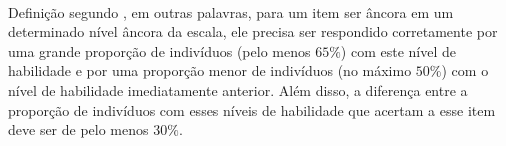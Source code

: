 	\paragraph{}
	    Definição segundo \textcite{Dalton}, em outras palavras, para um item ser âncora em um determinado nível âncora da escala, ele precisa ser respondido corretamente por uma grande 	proporção de indivíduos (pelo menos $65\%$) com este nível de habilidade e por uma proporção menor de indivíduos (no máximo $50\%$) com o nível de habilidade imediatamente anterior. Além disso, a diferença entre a proporção de indivíduos com esses níveis de habilidade que acertam a esse item deve ser de pelo menos $30\%$. 
	
	\newpage